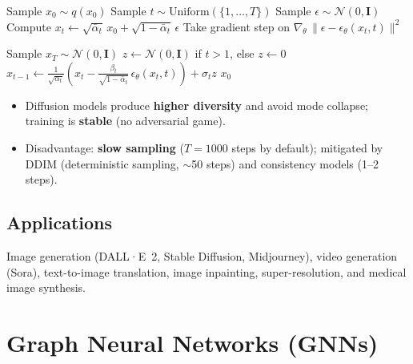 \documentclass[12pt,a4paper]{report}
\newcommand{\mat}[1]{\mathbf{#1}}
\begin{document}
\begin{algorithm}[H]
\caption{DDPM Training}
\begin{algorithmic}[1]
\Repeat
    \State Sample $x_0 \sim q(x_0)$
    \State Sample $t \sim \mathrm{Uniform}(\{1,\dots,T\})$
    \State Sample $\epsilon \sim \mathcal{N}(0,\mat{I})$
    \State Compute $x_t \gets \sqrt{\bar\alpha_t}\,x_0 + \sqrt{1-\bar\alpha_t}\,\epsilon$
    \State Take gradient step on $\nabla_\theta\,\|\epsilon - \epsilon_\theta(x_t,t)\|^2$
\end{algorithmic}
\end{algorithm}

\begin{algorithm}[H]
\caption{DDPM Sampling}
\begin{algorithmic}[1]
\State Sample $x_T \sim \mathcal{N}(0,\mat{I})$
    \State $z \gets \mathcal{N}(0,\mat{I})$ if $t > 1$, else $z \gets 0$
    \State $\displaystyle x_{t-1} \gets \frac{1}{\sqrt{\alpha_t}}\!\left(x_t - \frac{\beta_t}{\sqrt{1-\bar\alpha_t}}\,\epsilon_\theta(x_t,t)\right) + \sigma_t z$
\EndFor
\State \Return $x_0$
\end{algorithmic}
\end{algorithm}

\begin{importantbox}
\begin{itemize}[itemsep=1pt]
    \item Diffusion models produce \textbf{higher diversity} and avoid mode
          collapse; training is \textbf{stable} (no adversarial game).
    \item Disadvantage: \textbf{slow sampling} ($T = 1000$ steps by default);
          mitigated by DDIM (deterministic sampling, $\sim$50 steps) and
          consistency models (1--2 steps).
\end{itemize}
\end{importantbox}

\section{Applications}

Image generation (DALL·E~2, Stable Diffusion, Midjourney), video generation
(Sora), text-to-image translation, image inpainting, super-resolution,
and medical image synthesis.

\chapter{Graph Neural Networks (GNNs)}
\end{document}
